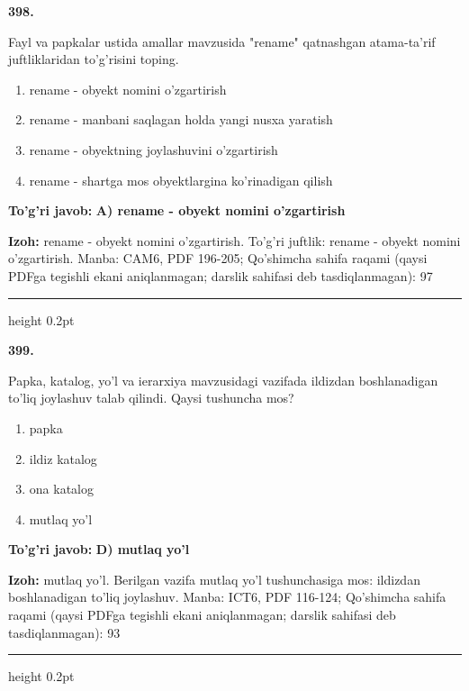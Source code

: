 \documentclass[10pt,a4paper]{article}
\begin{document}
{\bfseries\sffamily\color{ink} 398.}
\par
Fayl va papkalar ustida amallar mavzusida "rename" qatnashgan atama-ta'rif juftliklaridan to'g'risini toping.
\begin{enumerate}[label=\Alph*),leftmargin=9mm]
\item rename - obyekt nomini o'zgartirish
\item rename - manbani saqlagan holda yangi nusxa yaratish
\item rename - obyektning joylashuvini o'zgartirish
\item rename - shartga mos obyektlargina ko'rinadigan qilish
\end{enumerate}
\begin{tcolorbox}[enhanced,breakable,colback=teal!4,colframe=teal!60!black,boxrule=0.45pt,arc=1.2mm,left=2.7mm,right=2.7mm,top=1.8mm,bottom=1.8mm,before skip=2mm,after skip=2mm]
{\bfseries\sffamily\color{teal}To'g'ri javob:} \textbf{A) rename - obyekt nomini o'zgartirish}
\par\smallskip
{\bfseries Izoh:} rename - obyekt nomini o'zgartirish. To'g'ri juftlik: rename - obyekt nomini o'zgartirish. Manba: CAM6, PDF 196-205; Qo'shimcha sahifa raqami (qaysi PDFga tegishli ekani aniqlanmagan; darslik sahifasi deb tasdiqlanmagan): 97
\end{tcolorbox}
\vspace{2mm}\hrule height 0.2pt\vspace{3mm}

{\bfseries\sffamily\color{ink} 399.}
\par
Papka, katalog, yo'l va ierarxiya mavzusidagi vazifada ildizdan boshlanadigan to'liq joylashuv talab qilindi. Qaysi tushuncha mos?
\begin{enumerate}[label=\Alph*),leftmargin=9mm]
\item papka
\item ildiz katalog
\item ona katalog
\item mutlaq yo'l
\end{enumerate}
\begin{tcolorbox}[enhanced,breakable,colback=teal!4,colframe=teal!60!black,boxrule=0.45pt,arc=1.2mm,left=2.7mm,right=2.7mm,top=1.8mm,bottom=1.8mm,before skip=2mm,after skip=2mm]
{\bfseries\sffamily\color{teal}To'g'ri javob:} \textbf{D) mutlaq yo'l}
\par\smallskip
{\bfseries Izoh:} mutlaq yo'l. Berilgan vazifa mutlaq yo'l tushunchasiga mos: ildizdan boshlanadigan to'liq joylashuv. Manba: ICT6, PDF 116-124; Qo'shimcha sahifa raqami (qaysi PDFga tegishli ekani aniqlanmagan; darslik sahifasi deb tasdiqlanmagan): 93
\end{tcolorbox}
\vspace{2mm}\hrule height 0.2pt\vspace{3mm}
\end{document}
